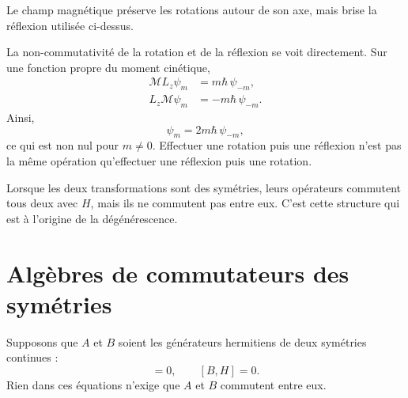 Le champ magnétique préserve les rotations autour de son axe, mais brise la réflexion utilisée ci-dessus.

\begin{classroomqa}
\end{classroomqa}

La non-commutativité de la rotation et de la réflexion se voit directement. Sur une fonction propre du moment cinétique,
\begin{align}
\mathcal M L_z\psi_m
&=m\hbar\,\psi_{-m},\\
L_z\mathcal M\psi_m
&=-m\hbar\,\psi_{-m}.
\end{align}
Ainsi,
\begin{equation}
[\mathcal M,L_z]\psi_m
=2m\hbar\,\psi_{-m},
\end{equation}
ce qui est non nul pour \(m\neq0\). Effectuer une rotation puis une réflexion n’est pas la même opération qu’effectuer une réflexion puis une rotation.

Lorsque les deux transformations sont des symétries, leurs opérateurs commutent tous deux avec \(H\), mais ils ne commutent pas entre eux. C’est cette structure qui est à l’origine de la dégénérescence.

\begin{classroomqa}
\end{classroomqa}

\section{Algèbres de commutateurs des symétries}

Supposons que \(A\) et \(B\) soient les générateurs hermitiens de deux symétries continues :
\begin{equation}
[A,H]=0,
\qquad
[B,H]=0.
\end{equation}
Rien dans ces équations n’exige que \(A\) et \(B\) commutent entre eux.

